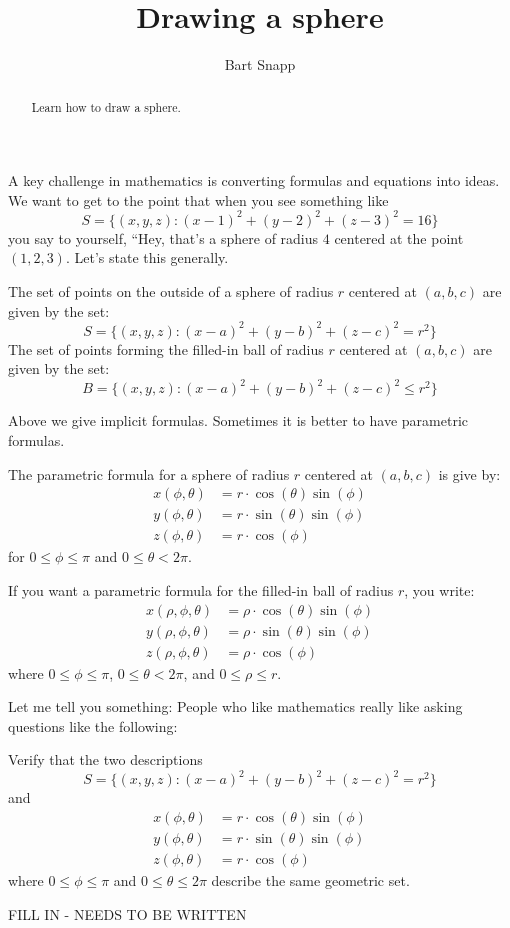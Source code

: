 \documentclass{ximera}
\author{Bart Snapp}
\title[Dig-In:]{Drawing a sphere}
\begin{document}
\begin{abstract}
  Learn how to draw a sphere.
\end{abstract}
\maketitle

A key challenge in mathematics is converting formulas and equations
into ideas. We want to get to the point that when you see something
like
\[
S = \{(x,y,z):(x-1)^2+(y-2)^2+(z-3)^2=16\}
\]
you say to yourself, ``Hey, that's a sphere of radius $4$ centered at
the point $(1,2,3)$. Let's state this generally.
\begin{theorem}
  The set of points on the outside of a sphere of radius $r$
  centered at $(a,b,c)$ are given by the set:
  \[
  S = \{(x,y,z):(x-a)^2+(y-b)^2+(z-c)^2=r^2\}
  \]
  The set of points forming the filled-in ball of radius $r$ centered
  at $(a,b,c)$ are given by the set:
  \[
  B = \{(x,y,z):(x-a)^2+(y-b)^2+(z-c)^2\le r^2\}
  \]
\end{theorem}
Above we give implicit formulas. Sometimes it is better to have
parametric formulas.
\begin{theorem}
  The parametric formula for a sphere of radius $r$ centered at
  $(a,b,c)$ is give by:
  \begin{align*}
    x(\phi,\theta) &=r\cdot\cos(\theta)\sin(\phi)\\
    y(\phi,\theta) &=r\cdot\sin(\theta)\sin(\phi)\\
    z(\phi,\theta) &=r\cdot\cos(\phi)
  \end{align*}
  for $0\le \phi\le \pi$ and $0\le\theta< 2\pi$.

  If you want a parametric formula for the filled-in ball of radius
  $r$, you write:
  \begin{align*}
    x(\rho,\phi,\theta) &=\rho\cdot\cos(\theta)\sin(\phi)\\
    y(\rho,\phi,\theta) &=\rho\cdot\sin(\theta)\sin(\phi)\\
    z(\rho,\phi,\theta) &=\rho\cdot\cos(\phi)
  \end{align*}
  where  $0\le \phi\le \pi$, $0\le\theta< 2\pi$, and $0\le \rho\le r$.
\end{theorem}

Let me tell you something: People who like mathematics really like
asking questions like the following:

\begin{example}
  Verify that the two descriptions
  \[
  S = \{(x,y,z):(x-a)^2+(y-b)^2+(z-c)^2=r^2\}
  \]
  and
  \begin{align*}
    x(\phi,\theta) &=r\cdot\cos(\theta)\sin(\phi)\\
    y(\phi,\theta) &=r\cdot\sin(\theta)\sin(\phi)\\
    z(\phi,\theta) &=r\cdot\cos(\phi)
  \end{align*}
  where $0\le \phi\le \pi$ and $0\le \theta\le 2\pi$ describe the same geometric set.
  \begin{explanation}
    FILL IN - NEEDS TO BE WRITTEN
  \end{explanation}
\end{example}
\end{document}
